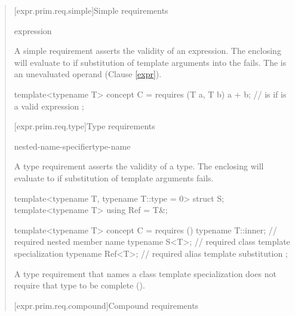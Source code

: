 \begin{quote}
\begin{addedblock}
[expr.prim.req.simple]{Simple requirements}

\begin{bnf}
\br
    expression \terminal{;}
\end{bnf}

\pnum
A simple requirement asserts the validity of an expression.
\enternote
The enclosing  will evaluate to 
if substitution of template arguments into the  fails.
The  is an unevaluated operand (Clause \ref{expr}).
\exitnote

\enterexample
\begin{codeblock}
template<typename T> concept C =
  requires (T a, T b) {
    a + b;  //  is  if  is a valid expression
  };
\end{codeblock}
\exitexample


[expr.prim.req.type]{Type requirements}

\begin{bnf}
\br
     nested-name-specifier\opt type-name \terminal{;}
\end{bnf}

\pnum
A type requirement asserts the validity of a type.
\enternote
The enclosing  will evaluate to 
if substitution of template arguments fails.
\exitnote
\enterexample
\begin{codeblock}
template<typename T, typename T::type = 0> struct S;
template<typename T> using Ref = T&;

template<typename T> concept C =
  requires () {
    typename T::inner; // required nested member name
    typename S<T>;     // required class template specialization
    typename Ref<T>;   // required alias template substitution
  };
\end{codeblock}
\exitexample

\pnum
A type requirement that names a class template specialization 
does not require that type to be complete 
().


[expr.prim.req.compound]{Compound requirements}
      

\end{addedblock}
\end{quote}
